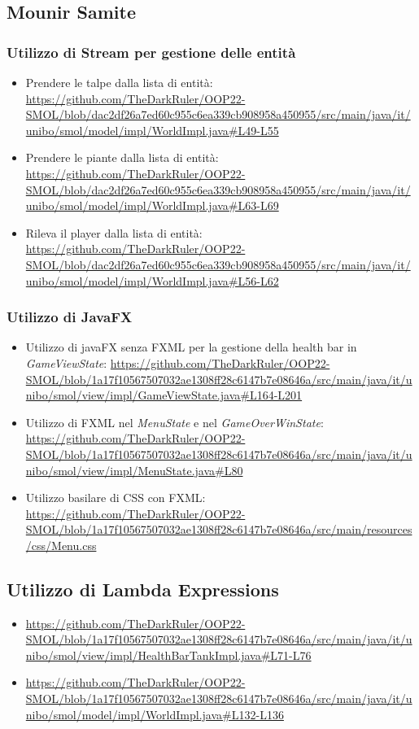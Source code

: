 \documentclass[a4paper,12pt]{report}
\begin{document}
\subsection*{Mounir Samite}
\subsubsection*{Utilizzo di Stream per gestione delle entità}
\begin{itemize}
    \item Prendere le talpe dalla lista di entità: \url{https://github.com/TheDarkRuler/OOP22-SMOL/blob/dac2df26a7ed60c955c6ea339cb908958a450955/src/main/java/it/unibo/smol/model/impl/WorldImpl.java#L49-L55}
    \item Prendere le piante dalla lista di entità: \url{https://github.com/TheDarkRuler/OOP22-SMOL/blob/dac2df26a7ed60c955c6ea339cb908958a450955/src/main/java/it/unibo/smol/model/impl/WorldImpl.java#L63-L69}
    \item Rileva il player dalla lista di entità: \url{https://github.com/TheDarkRuler/OOP22-SMOL/blob/dac2df26a7ed60c955c6ea339cb908958a450955/src/main/java/it/unibo/smol/model/impl/WorldImpl.java#L56-L62}
\end{itemize}
\subsubsection*{Utilizzo di JavaFX}
\begin{itemize}
    \item Utilizzo di javaFX senza FXML per la gestione della health bar in \emph{GameViewState}: \url{https://github.com/TheDarkRuler/OOP22-SMOL/blob/1a17f10567507032ae1308ff28c6147b7e08646a/src/main/java/it/unibo/smol/view/impl/GameViewState.java#L164-L201}
    \item Utilizzo di FXML nel \emph{MenuState} e nel \emph{GameOverWinState}: \url{https://github.com/TheDarkRuler/OOP22-SMOL/blob/1a17f10567507032ae1308ff28c6147b7e08646a/src/main/java/it/unibo/smol/view/impl/MenuState.java#L80}
    \item Utilizzo basilare di CSS con FXML: \url{https://github.com/TheDarkRuler/OOP22-SMOL/blob/1a17f10567507032ae1308ff28c6147b7e08646a/src/main/resources/css/Menu.css}
\end{itemize}

\subsection*{Utilizzo di Lambda Expressions}
\begin{itemize}
    \item \url{https://github.com/TheDarkRuler/OOP22-SMOL/blob/1a17f10567507032ae1308ff28c6147b7e08646a/src/main/java/it/unibo/smol/view/impl/HealthBarTankImpl.java#L71-L76}
    \item \url{https://github.com/TheDarkRuler/OOP22-SMOL/blob/1a17f10567507032ae1308ff28c6147b7e08646a/src/main/java/it/unibo/smol/model/impl/WorldImpl.java#L132-L136}
\end{itemize}
\end{document}

